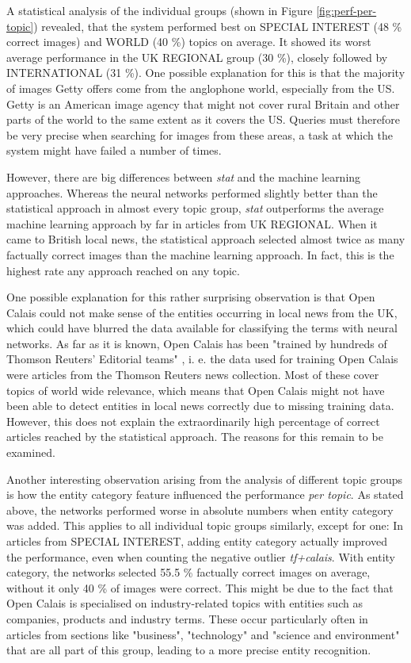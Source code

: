 \documentclass[11pt,a4paper,twoside]{article}
\begin{document}
A statistical analysis of the individual groups (shown in Figure \ref{fig:perf-per-topic}) revealed, that the system performed best on SPECIAL INTEREST (48 \% correct images) and WORLD (40 \%) topics on average. It showed its worst average performance in the UK REGIONAL group (30 \%), closely followed by INTERNATIONAL (31 \%). One possible explanation for this is that the majority of images Getty offers come from the anglophone world, especially from the US. Getty is an American image agency that might not cover rural Britain and other parts of the world to the same extent as it covers the US. Queries must therefore be very precise when searching for images from these areas, a task at which the system might have failed a number of times.

However, there are big differences between \emph{stat} and the machine learning approaches. Whereas the neural networks performed slightly better than the statistical approach in almost every topic group, \emph{stat} outperforms the average machine learning approach by far in articles from UK REGIONAL. When it came to British local news, the statistical approach selected almost twice as many factually correct images than the machine learning approach. In fact, this is the highest rate any approach reached on any topic.

One possible explanation for this rather surprising observation is that Open Calais could not make sense of the entities occurring in local news from the UK, which could have blurred the data available for classifying the terms with neural networks. As far as it is known, Open Calais has been "trained by hundreds of Thomson Reuters' Editorial teams" \cite{ThomsonReutersAboutCalais}, i. e. the data used for training Open Calais were articles from the Thomson Reuters news collection. Most of these cover topics of world wide relevance, which means that Open Calais might not have been able to detect entities in local news correctly due to missing training data. However, this does not explain the extraordinarily high percentage of correct articles reached by the statistical approach. The reasons for this remain to be examined.

\bigskip

Another interesting observation arising from the analysis of different topic groups is how the entity category feature influenced the performance \emph{per topic}. As stated above, the networks performed worse in absolute numbers when entity category was added. This applies to all individual topic groups similarly, except for one: In articles from SPECIAL INTEREST, adding entity category actually improved the performance, even when counting the negative outlier \emph{tf+calais}. With entity category, the networks selected 55.5 \% factually correct images on average, without it only 40 \% of images were correct. This might be due to the fact that Open Calais is specialised on industry-related topics with entities such as companies, products and industry terms. These occur particularly often in articles from sections like "business", "technology" and "science and environment" that are all part of this group, leading to a more precise entity recognition.
\end{document}
